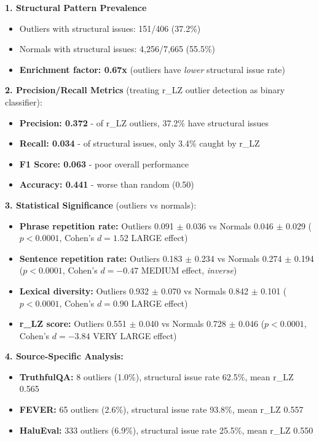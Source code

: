 \documentclass[11pt]{article}
\begin{document}
\textbf{1. Structural Pattern Prevalence}
\begin{itemize}
\item Outliers with structural issues: 151/406 (37.2\%)
\item Normals with structural issues: 4,256/7,665 (55.5\%)
\item \textbf{Enrichment factor: 0.67x} (outliers have \textit{lower} structural issue rate)
\end{itemize}

\textbf{2. Precision/Recall Metrics} (treating r\_LZ outlier detection as binary classifier):
\begin{itemize}
\item \textbf{Precision: 0.372} - of r\_LZ outliers, 37.2\% have structural issues
\item \textbf{Recall: 0.034} - of structural issues, only 3.4\% caught by r\_LZ
\item \textbf{F1 Score: 0.063} - poor overall performance
\item \textbf{Accuracy: 0.441} - worse than random (0.50)
\end{itemize}

\textbf{3. Statistical Significance} (outliers vs normals):
\begin{itemize}
\item \textbf{Phrase repetition rate:} Outliers 0.091 $\pm$ 0.036 vs Normals 0.046 $\pm$ 0.029 ($p<0.0001$, Cohen's $d=1.52$ LARGE effect)
\item \textbf{Sentence repetition rate:} Outliers 0.183 $\pm$ 0.234 vs Normals 0.274 $\pm$ 0.194 ($p<0.0001$, Cohen's $d=-0.47$ MEDIUM effect, \textit{inverse})
\item \textbf{Lexical diversity:} Outliers 0.932 $\pm$ 0.070 vs Normals 0.842 $\pm$ 0.101 ($p<0.0001$, Cohen's $d=0.90$ LARGE effect)
\item \textbf{r\_LZ score:} Outliers 0.551 $\pm$ 0.040 vs Normals 0.728 $\pm$ 0.046 ($p<0.0001$, Cohen's $d=-3.84$ VERY LARGE effect)
\end{itemize}

\textbf{4. Source-Specific Analysis:}
\begin{itemize}
\item \textbf{TruthfulQA:} 8 outliers (1.0\%), structural issue rate 62.5\%, mean r\_LZ 0.565
\item \textbf{FEVER:} 65 outliers (2.6\%), structural issue rate 93.8\%, mean r\_LZ 0.557
\item \textbf{HaluEval:} 333 outliers (6.9\%), structural issue rate 25.5\%, mean r\_LZ 0.550
\end{itemize}
\end{document}
